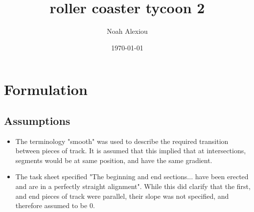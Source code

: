 \documentclass[11pt, letterpaper]{article}
\begin{document}
\begin{titlepage}
	\title{roller coaster tycoon 2}
	\author{Noah Alexiou}
	\date{\today}
	
	\maketitle
	\centering

	
\end{titlepage}


\newpage
\tableofcontents


\newpage


\section{Formulation}
\subsection{Assumptions}
\begin{itemize}
	\item The terminology "smooth" was used to describe the required transition between pieces of track. It is assumed that this implied that at intersections, segments would be at same position, and have the same gradient.
	\item The task sheet specified "The beginning and end sections... have been erected and are in a perfectly straight alignment". While this did clarify that the first, and end pieces of track were parallel, their slope was not specified, and therefore assumed to be 0.
\end{itemize}
\end{document}
